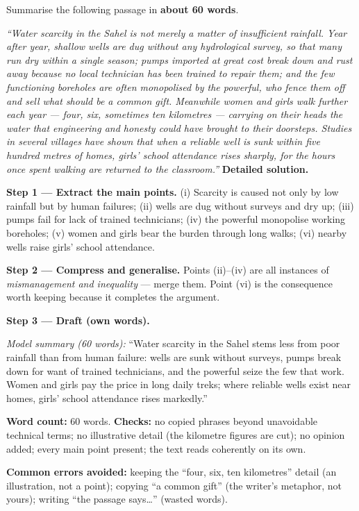 \documentclass[11pt]{article}
\begin{document}
\begin{exoresolu}
Summarise the following passage in \textbf{about 60 words}.

\emph{``Water scarcity in the Sahel is not merely a matter of insufficient rainfall. Year after year, shallow wells are dug without any hydrological survey, so that many run dry within a single season; pumps imported at great cost break down and rust away because no local technician has been trained to repair them; and the few functioning boreholes are often monopolised by the powerful, who fence them off and sell what should be a common gift. Meanwhile women and girls walk further each year — four, six, sometimes ten kilometres — carrying on their heads the water that engineering and honesty could have brought to their doorsteps. Studies in several villages have shown that when a reliable well is sunk within five hundred metres of homes, girls' school attendance rises sharply, for the hours once spent walking are returned to the classroom.''}
\tcblower
\textbf{Detailed solution.}

\textbf{Step 1 — Extract the main points.} (i) Scarcity is caused not only by low rainfall but by human failures; (ii) wells are dug without surveys and dry up; (iii) pumps fail for lack of trained technicians; (iv) the powerful monopolise working boreholes; (v) women and girls bear the burden through long walks; (vi) nearby wells raise girls' school attendance.

\textbf{Step 2 — Compress and generalise.} Points (ii)--(iv) are all instances of \emph{mismanagement and inequality} — merge them. Point (vi) is the consequence worth keeping because it completes the argument.

\textbf{Step 3 — Draft (own words).}

\emph{Model summary (60 words):} ``Water scarcity in the Sahel stems less from poor rainfall than from human failure: wells are sunk without surveys, pumps break down for want of trained technicians, and the powerful seize the few that work. Women and girls pay the price in long daily treks; where reliable wells exist near homes, girls' school attendance rises markedly.''

\textbf{Word count:} 60 words. \textbf{Checks:} no copied phrases beyond unavoidable technical terms; no illustrative detail (the kilometre figures are cut); no opinion added; every main point present; the text reads coherently on its own.

\textbf{Common errors avoided:} keeping the ``four, six, ten kilometres'' detail (an illustration, not a point); copying ``a common gift'' (the writer's metaphor, not yours); writing ``the passage says\ldots'' (wasted words).
\end{exoresolu}
\end{document}
